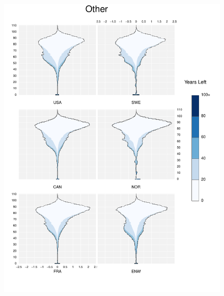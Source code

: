 \documentclass{article}
\begin{document}
\begin{appendices}
\begin{figure}
\includegraphics[scale=.8]{Figures/Causes/DxyOther.pdf}
\end{figure}

\pagebreak

\end{appendices}
\end{document}
